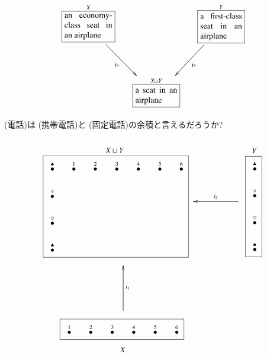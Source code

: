 \begin{example}\label{ex:airplanes}

\begin{align}\label{dia:airplane}
\xymatrix@=15pt{
\obox{X}{.8in}{an economy-class seat in an airplane}\LAL{ddr}{is}&&\obox{Y}{.7in}{a first-class seat in an airplane}\LA{ddl}{is}\\\\
&\obox{X\sqcup Y}{.7in}{a seat in an airplane}
}
\end{align}

\end{example}

\begin{exercise}
 (電話)は (携帯電話)と (固定電話)の余積と言えるだろうか?
\end{exercise}

\begin{example}\label{ex:coprod of dots}

\begin{align}
\parbox{2.4in}{\begin{center}\small $X\sqcup Y$\vspace{-.1in}\end{center}\fbox{
\xymatrix@=15pt{
\LMO{\clubsuit}&\LMO{1}&\LMO{2}&\LMO{3}&\LMO{4}&\LMO{5}&\LMO{6}\\\LMO{\diamondsuit}\\\LMO{\heartsuit}\\\LMO{\spadesuit}
}}}
\parbox{.9in}{
\xymatrix{~&&\ar[ll]_{i_2}~}
}
\parbox{.3in}{\begin{center}\small $Y$\vspace{-.1in}\end{center}\fbox{
\xymatrix@=15pt{
\LMO{\clubsuit}\\\LMO{\diamondsuit}\\\LMO{\heartsuit}\\\LMO{\spadesuit}
}}}
\\\nonumber
\parbox{1in}{\hspace{-1.4in}\xymatrix{~\\\\\ar[uu]_{i_1}}}
\\\nonumber
\parbox{2.1in}{\hspace{-1.3in}\fbox{
\xymatrix@=15pt{
\LMO{1}&\LMO{2}&\LMO{3}&\LMO{4}&\LMO{5}&\LMO{6}
}}\begin{center}\hspace{-2.6in}\small$X$\end{center}}
\end{align}

\end{example}

